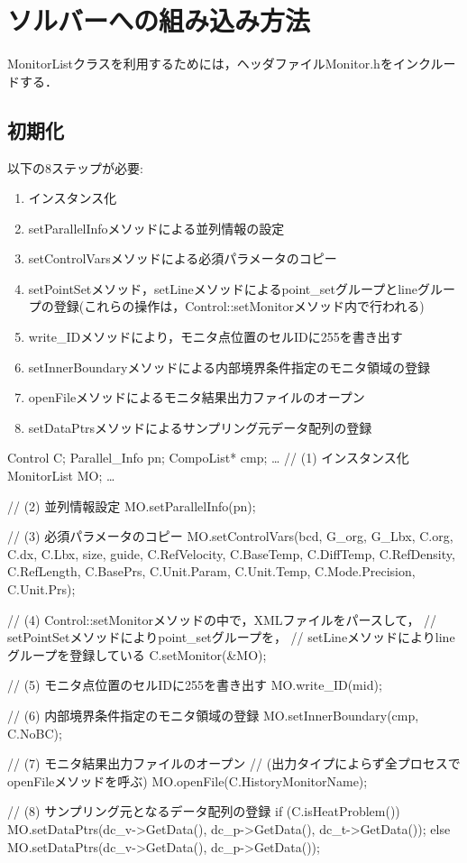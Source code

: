 \pagebreak
\section{ソルバーへの組み込み方法}
MonitorListクラスを利用するためには，ヘッダファイルMonitor.hをインクルードする．

\subsection{初期化}
以下の8ステップが必要:

\begin{enumerate}
\item インスタンス化
\item setParallelInfoメソッドによる並列情報の設定
\item setControlVarsメソッドによる必須パラメータのコピー
\item setPointSetメソッド，setLineメソッドによるpoint\_setグループとlineグループの登録(これらの操作は，Control::setMonitorメソッド内で行われる)
\item write\_IDメソッドにより，モニタ点位置のセルIDに255を書き出す
\item setInnerBoundaryメソッドによる内部境界条件指定のモニタ領域の登録
\item openFileメソッドによるモニタ結果出力ファイルのオープン
\item setDataPtrsメソッドによるサンプリング元データ配列の登録
\end{enumerate}

{\small
\begin{program}
  Control       C;
  Parallel_Info pn;
  CompoList*    cmp;
  …
  // (1) インスタンス化
  MonitorList MO;
  …

  // (2) 並列情報設定
  MO.setParallelInfo(pn);

  // (3) 必須パラメータのコピー
  MO.setControlVars(bcd, G_org, G_Lbx, C.org, C.dx, C.Lbx, size, guide,
               C.RefVelocity, C.BaseTemp, C.DiffTemp, C.RefDensity, C.RefLength,
               C.BasePrs, C.Unit.Param, C.Unit.Temp, C.Mode.Precision, C.Unit.Prs);

  // (4) Control::setMonitorメソッドの中で，XMLファイルをパースして，
  //     setPointSetメソッドによりpoint_setグループを，
  //     setLineメソッドによりlineグループを登録している
  C.setMonitor(&MO);

  // (5) モニタ点位置のセルIDに255を書き出す
  MO.write_ID(mid);

  // (6) 内部境界条件指定のモニタ領域の登録
  MO.setInnerBoundary(cmp, C.NoBC);

  // (7) モニタ結果出力ファイルのオープン
  //    (出力タイプによらず全プロセスでopenFileメソッドを呼ぶ)
  MO.openFile(C.HistoryMonitorName);

  // (8) サンプリング元となるデータ配列の登録
  if (C.isHeatProblem()) {
    MO.setDataPtrs(dc_v->GetData(), dc_p->GetData(), dc_t->GetData());
  } else {
    MO.setDataPtrs(dc_v->GetData(), dc_p->GetData());
  }
\end{program}
}

